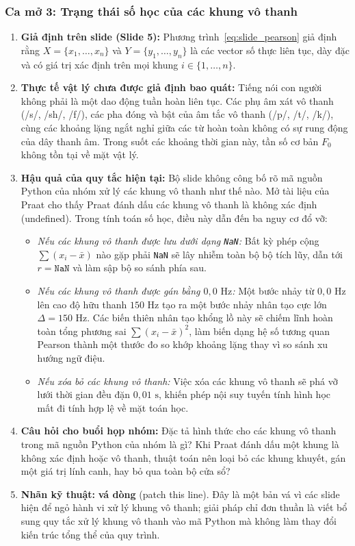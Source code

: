 \documentclass[11pt,a4paper]{article}
\begin{document}
\subsubsection*{Ca mở 3: Trạng thái số học của các khung vô thanh}

\begin{enumerate}
    \item \textbf{Giả định trên slide (Slide 5):} Phương trình~\eqref{eq:slide_pearson} giả định rằng $X = \{x_1, \dots, x_n\}$ và $Y = \{y_1, \dots, y_n\}$ là các vector số thực liên tục, dày đặc và có giá trị xác định trên mọi khung $i \in \{1, \dots, n\}$.
    \item \textbf{Thực tế vật lý chưa được giả định bao quát:} Tiếng nói con người không phải là một dao động tuần hoàn liên tục. Các phụ âm xát vô thanh (/s/, /sh/, /f/), các pha đóng và bật của âm tắc vô thanh (/p/, /t/, /k/), cùng các khoảng lặng ngắt nghỉ giữa các từ hoàn toàn không có sự rung động của dây thanh âm. Trong suốt các khoảng thời gian này, tần số cơ bản $F_0$ không tồn tại về mặt vật lý.
    \item \textbf{Hậu quả của quy tắc hiện tại:} Bộ slide không công bố rõ mã nguồn Python của nhóm xử lý các khung vô thanh như thế nào. Mở tài liệu của Praat cho thấy Praat đánh dấu các khung vô thanh là không xác định (undefined). Trong tính toán số học, điều này dẫn đến ba nguy cơ đổ vỡ:
    \begin{itemize}
        \item \textit{Nếu các khung vô thanh được lưu dưới dạng \texttt{NaN}:} Bất kỳ phép cộng $\sum (x_i - \bar{x})$ nào gặp phải \texttt{NaN} sẽ lây nhiễm toàn bộ bộ tích lũy, dẫn tới $r = \texttt{NaN}$ và làm sập bộ so sánh phía sau.
        \item \textit{Nếu các khung vô thanh được gán bằng $0{,}0\text{ Hz}$:} Một bước nhảy từ $0{,}0\text{ Hz}$ lên cao độ hữu thanh $150\text{ Hz}$ tạo ra một bước nhảy nhân tạo cực lớn $\Delta = 150\text{ Hz}$. Các biến thiên nhân tạo khổng lồ này sẽ chiếm lĩnh hoàn toàn tổng phương sai $\sum (x_i - \bar{x})^2$, làm biến dạng hệ số tương quan Pearson thành một thước đo so khớp khoảng lặng thay vì so sánh xu hướng ngữ điệu.
        \item \textit{Nếu xóa bỏ các khung vô thanh:} Việc xóa các khung vô thanh sẽ phá vỡ lưới thời gian đều đặn $0{,}01\text{ s}$, khiến phép nội suy tuyến tính hình học mất đi tính hợp lệ về mặt toán học.
    \end{itemize}
    \item \textbf{Câu hỏi cho buổi họp nhóm:} Đặc tả hình thức cho các khung vô thanh trong mã nguồn Python của nhóm là gì? Khi Praat đánh dấu một khung là không xác định hoặc vô thanh, thuật toán nên loại bỏ các khung khuyết, gán một giá trị lính canh, hay bỏ qua toàn bộ cửa sổ?
    \item \textbf{Nhãn kỹ thuật:} \textbf{vá dòng} (patch this line). Đây là một bản vá vì các slide hiện để ngỏ hành vi xử lý khung vô thanh; giải pháp chỉ đơn thuần là viết bổ sung quy tắc xử lý khung vô thanh vào mã Python mà không làm thay đổi kiến trúc tổng thể của quy trình.
\end{enumerate}
\end{document}
